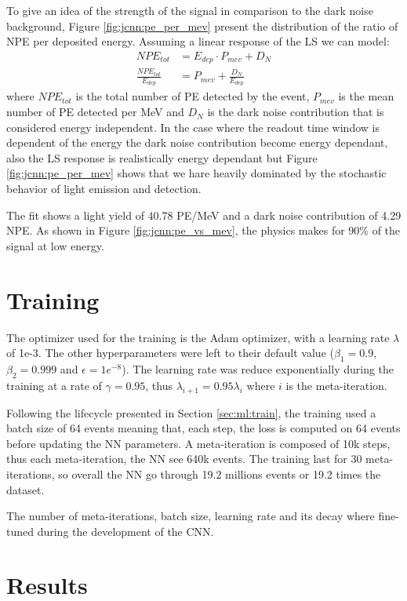 \documentclass[../main.tex]{subfiles}
\begin{document}
To give an idea of the strength of the signal in comparison to the dark noise background, Figure \ref{fig:jcnn:pe_per_mev} present the distribution of the ratio of NPE per deposited energy. Assuming a linear response of the LS we can model:
\begin{align}
  NPE_{tot} &= E_{dep} \cdot P_{mev} + D_{N} \\
  \frac{NPE_{tot}}{E_{dep}} &= P_{mev} + \frac{D_{N}}{E_{dep}} \label{eq:jcnn:pe_per_mev}
\end{align}
where $NPE_{tot}$ is the total number of PE detected by the event, $P_{mev}$ is the mean number of PE detected per MeV and $D_{N}$ is the dark noise contribution that is considered energy independent. In the case where the readout time window is dependent of the energy the dark noise contribution become energy dependant, also the LS response is realistically energy dependant but Figure \ref{fig:jcnn:pe_per_mev} shows that we hare heavily dominated by the stochastic behavior of light emission and detection.

The fit shows a light yield of 40.78 PE/MeV and a dark noise contribution of 4.29 NPE. As shown in Figure \ref{fig:jcnn:pe_vs_mev}, the physics makes for 90\% of the signal at low energy.

\section{Training}

The optimizer used for the training is the Adam \cite{kingma_adam_2017} optimizer, with a learning rate $\lambda$ of 1e-3. The other hyperparameters were left to their default value ($\beta_1= 0.9$, $\beta_2 = 0.999$ and $\epsilon = 1e^{-8}$). The learning rate was reduce exponentially during the training at a rate of $\gamma = 0.95$, thus $\lambda_{i+1} = 0.95\lambda_i$ where $i$ is the meta-iteration.

Following the lifecycle presented in Section \ref{sec:ml:train}, the training used a batch size of 64 events meaning that, each step, the loss is computed on 64 events before updating the NN parameters. A meta-iteration is composed of 10k steps, thus each meta-iteration, the NN see 640k events. The training last for 30 meta-iterations, so overall the NN go through 19.2 millions events or 19.2 times the dataset.

The number of meta-iterations, batch size, learning rate and its decay where fine-tuned during the development of the CNN.

\section{Results}
\label{sec:jcnn:results}
\end{document}
